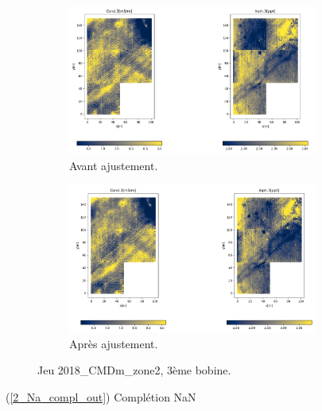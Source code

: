 \documentclass[12pt]{article}
\begin{document}
    \begin{figure}[ht!]
        \centering
        \begin{subfigure}[b]{\textwidth}
            \centering
            \includegraphics[width=0.9\textwidth]{Images/Frontiere_ex2_3.png}
            \caption[]%
            {{ \small Avant ajustement.}}    
        \end{subfigure}
        \centering
        \begin{subfigure}[b]{\textwidth}  
            \centering 
            \includegraphics[width=0.9\textwidth]{Images/Frontiere_ex2_3_aj.png}
            \caption[]%
            {{\small Après ajustement.}}    
        \end{subfigure}
        \caption{Jeu 2018\_CMDm\_zone2, 3ème bobine.}
    \end{figure}

\newpage
    \label{2_Na_compl_in} (\ref{2_Na_compl_out}) Complétion NaN
\end{document}
